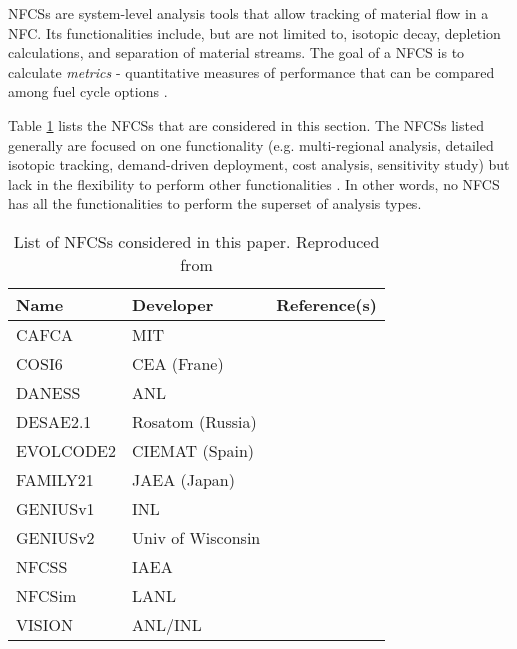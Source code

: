\glspl{NFCS} are system-level analysis tools
that allow tracking of material flow in a \gls{NFC}. Its
functionalities include, but are not limited to, isotopic decay,
depletion calculations, and separation of material streams.
The goal of a \gls{NFCS} is to calculate \textit{metrics} - quantitative
measures of performance that can be compared among fuel cycle
options \cite{huff_fundamental_2016}.

Table \ref{tab:fcs} lists the \glspl{NFCS}
that are considered in this section. The \glspl{NFCS}
listed generally are focused on one functionality
(e.g. multi-regional analysis, detailed isotopic tracking,
demand-driven deployment, cost analysis, sensitivity study)
but lack in the flexibility to perform other
functionalities \cite{huff_next_2010}. In
other words, no \gls{NFCS} has all the functionalities to
perform the superset of analysis types.

\begin{table}[h]
    \centering
    \caption{List of \glspl{NFCS} considered in this paper.
             Reproduced from \cite{huff_next_2010}}
    \label{tab:fcs}
    \begin{tabular}{lll}
        \hline
        Name & Developer & Reference(s) \\
        \hline
        CAFCA & MIT & \cite{guerin_benchmark_2009}\\
        COSI6 & CEA (Frane) & \cite{meyer_new_2009} \\
        DANESS & ANL & \cite{van_den_durpel_daness:_2006}\\
        DESAE2.1 & Rosatom (Russia) & \cite{tsibulskiy_desae_2006}\\
        EVOLCODE2 & CIEMAT (Spain) & \cite{alvarez-velarde_validation_2014}\\
        FAMILY21 & JAEA (Japan) & \cite{oecd_nuclear_2009}\\
        GENIUSv1 & INL & \cite{dunzik-gougar_global_2007}\\
        GENIUSv2 & Univ of Wisconsin & \cite{dunn_genius_2009}\\
        NFCSS & IAEA & \cite{iaea_guidance_2008}\\
        NFCSim & LANL & \cite{schneider_nfcsim:_2005} \\
        VISION & ANL/INL & \cite{jacobson_verifiable_2010} \\
        \hline
    \end{tabular}
\end{table}



